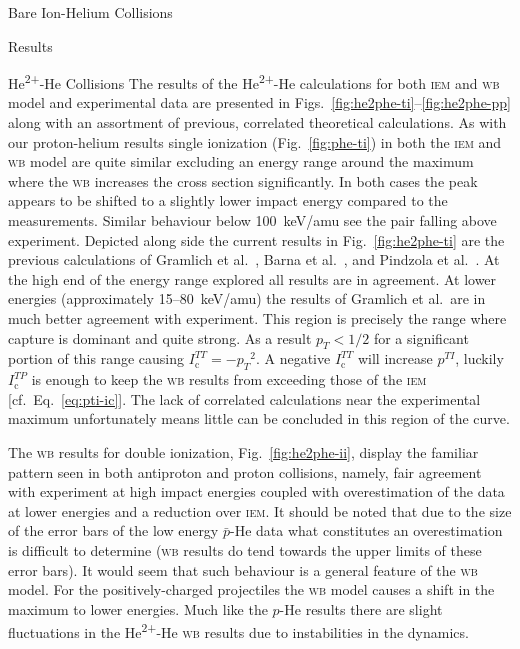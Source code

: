 \documentclass[letterpaper, 11 pt]{report}
\begin{document}
\begin{chapter}{Bare Ion-Helium Collisions \label{chap:p-he2p-he}}
\begin{section}{Results \label{sec:phe2p-res}}
\begin{subsection}{\texorpdfstring{He\textsuperscript{2+}}{He2+}-He Collisions
                         \label{sec:he2phe-res}}
         The results of the He\textsuperscript{2+}-He calculations for both \textsc{iem} and \textsc{wb}
         model and experimental data are presented in Figs.~\ref{fig:he2phe-ti}--\ref{fig:he2phe-pp}
         along with an assortment of previous, correlated theoretical calculations. As with our
         proton-helium results single ionization (Fig.~\ref{fig:phe-ti}) in both the \textsc{iem} and
         \textsc{wb} model are quite similar excluding an energy range around the maximum where the
         \textsc{wb} increases the cross section significantly. In both cases the peak appears to be
         shifted to a slightly lower impact energy compared to the measurements. Similar behaviour below
         100~keV/amu see the pair falling above experiment. Depicted along side the current results in
         Fig.~\ref{fig:he2phe-ti} are the previous calculations of Gramlich et al.~\cite{GGS-89}, Barna
         et al.~\cite{BTB-05}, and Pindzola et al.~\cite{PRC-07}. At the high end of the energy range
         explored all results are in agreement. At lower energies (approximately 15--80~keV/amu) the
         results of Gramlich et al.\ are in much better agreement with experiment. This region is
         precisely the range where capture is dominant and quite strong. As a result $p_T < 1/2$ for a
         significant portion of this range causing $I^{TT}_\mathrm{c} = -{p_T}^2$. A negative
         $I^{TT}_\mathrm{c}$ will increase $p^{TI}$, luckily $I^{TP}_\mathrm{c}$ is enough to keep the
         \textsc{wb} results from exceeding those of the \textsc{iem}  [cf.\ Eq.~\eqref{eq:pti-ic}]. The
         lack of correlated calculations near the experimental maximum unfortunately means little can be
         concluded in this region of the curve.

         The \textsc{wb} results for double ionization, Fig.~\ref{fig:he2phe-ii}, display the familiar
         pattern seen in both antiproton and proton collisions, namely, fair agreement with experiment
         at high impact energies coupled with overestimation of the data at lower energies and a
         reduction over \textsc{iem}. It should be noted that due to the size of the error bars of the
         low energy $\bar{p}$-He data what constitutes an overestimation is difficult to determine
         (\textsc{wb} results do tend towards the upper limits of these error bars). It would seem that
         such behaviour is a general feature of the \textsc{wb} model. For the positively-charged
         projectiles the \textsc{wb} model causes a shift in the maximum to lower energies. Much like
         the $p$-He results there are slight fluctuations in the He\textsuperscript{2+}-He \textsc{wb}
         results due to instabilities in the dynamics.


\end{subsection}
\end{section}
\end{chapter}
\end{document}
